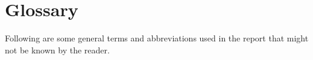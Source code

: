 \chapter{Glossary}
Following are some general terms and abbreviations used in the report that might not be known by the reader.
